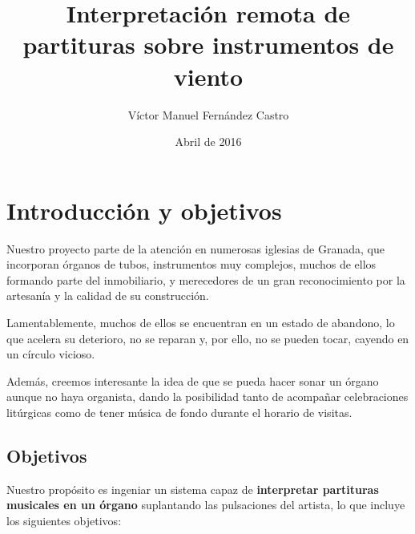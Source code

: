 \documentclass[10pt,a4paper]{article}
\title{Interpretación remota de partituras sobre instrumentos de viento}
\author{Víctor Manuel Fernández Castro}
\date{Abril de 2016}
\begin{document}
	
	
	\maketitle
	\thispagestyle{empty}
	
	
	\newpage
	\tableofcontents
	
	
	\newpage
	\pagestyle{fancy}
	\section{Introducción y objetivos}
	
	Nuestro proyecto parte de la atención en numerosas iglesias de Granada, que
	incorporan órganos de tubos, instrumentos muy complejos, muchos de ellos
	formando parte del inmobiliario, y merecedores de un gran reconocimiento por
	la artesanía y la calidad de su construcción.
	
	Lamentablemente, muchos de ellos se encuentran en un estado de abandono, lo
	que acelera su deterioro, no se reparan y, por ello, no se pueden tocar,
	cayendo en un círculo vicioso.
	
	Además, creemos interesante la idea de que se pueda hacer sonar un órgano
	aunque no haya organista, dando la posibilidad tanto de acompañar
	celebraciones litúrgicas como de tener música de fondo durante el horario de
	visitas.
	
	\subsection{Objetivos}
	
	Nuestro propósito es ingeniar un sistema capaz de \textbf{interpretar
	partituras musicales en un órgano} suplantando las pulsaciones del artista,
	lo que incluye los siguientes objetivos:
	
\end{document}
